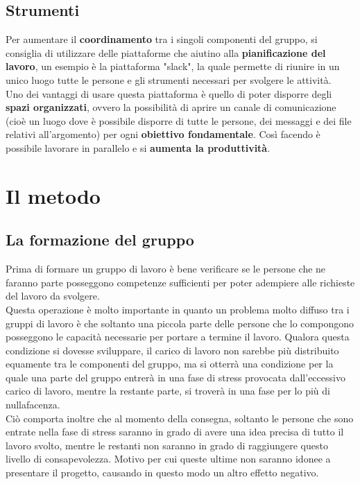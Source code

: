 \documentclass[11pt,a4paper]{article}
\begin{document}
	\subsection{Strumenti}
	Per aumentare il \textbf{coordinamento} tra i singoli componenti del gruppo, si consiglia di utilizzare delle piattaforme che aiutino alla \textbf{pianificazione del lavoro}, un esempio è la piattaforma "slack", la quale permette di riunire in un unico luogo tutte le persone e gli strumenti necessari per svolgere le attività.\\
	Uno dei vantaggi di usare questa piattaforma è quello di poter disporre degli \textbf{spazi organizzati}, ovvero la possibilità di aprire un canale di comunicazione (cioè un luogo dove è possibile disporre di tutte le persone, dei messaggi e dei  file relativi all'argomento) per ogni \textbf{obiettivo fondamentale}. Così facendo è possibile lavorare in parallelo e si \textbf{aumenta la produttività}. 
	\newpage
	
	\section{Il metodo}
	\subsection{La formazione del gruppo}
	Prima di formare un gruppo di lavoro è bene verificare se le persone che ne faranno parte posseggono competenze sufficienti per poter adempiere alle richieste del lavoro da svolgere.\\
	Questa operazione è molto importante in quanto un problema molto diffuso tra i gruppi di lavoro è che soltanto una piccola parte delle persone che lo compongono posseggono le capacità necessarie per portare a termine il lavoro. Qualora questa condizione si dovesse sviluppare, il carico di lavoro non sarebbe più distribuito equamente tra le componenti del gruppo, ma si otterrà una condizione per la quale una parte del gruppo entrerà in una fase di stress provocata dall'eccessivo carico di lavoro, mentre la restante parte, si troverà in una fase per lo più di nullafacenza.\\
	Ciò comporta inoltre che al momento della consegna, soltanto le persone che sono entrate nella fase di stress saranno in grado di avere una idea precisa di tutto il lavoro svolto, mentre le restanti non saranno in grado di raggiungere questo livello di consapevolezza. Motivo per cui  queste ultime non saranno idonee a presentare il progetto, causando in questo modo un altro effetto negativo.\\
	
\end{document}
